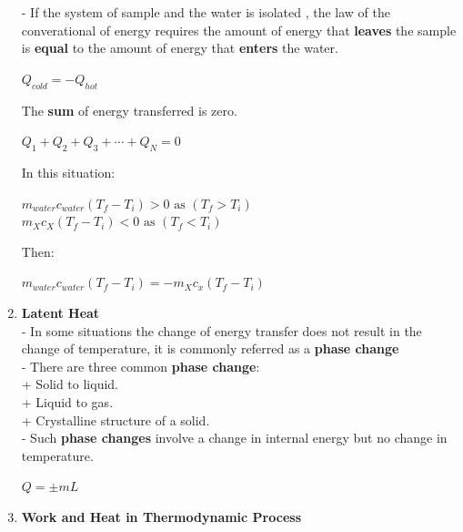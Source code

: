 \documentclass[10pt]{article}
\begin{document}
\begin{enumerate}
	- If the system of sample and the water is isolated , the law of the converational of energy requires the amount of energy that \textbf{leaves} the sample is \textbf{equal} to the amount of energy that \textbf{enters} the water.\\
	\begin{mybox}
	\begin{center}
	$Q_{cold} = -Q_{hot}$
	\end{center}
	\end{mybox}
      The \textbf{sum} of energy transferred is zero.
      \begin{mybox}
      \begin{center}
      $Q_1 + Q_2 + Q_3 + \cdots +Q_N = 0$
      \end{center}    
      \end{mybox}    
	In this situation:
	\begin{center}
	$m_{water}c_{water}(T_f-T_i) > 0 \mbox{ as }(T_f > T_i)$\\
	$m_Xc_X(T_f-T_i) <0 \mbox{ as } (T_f < T_i)$\\
	\end{center}
	Then:
	\begin{mybox}
	\begin{center}
	 $m_{water}c_{water}(T_f-T_i) = -m_Xc_x(T_f-T_i)$
	 \end{center}
	 \end{mybox}
	 \item \textbf{Latent Heat}\\
	 - In some situations the change of energy transfer does not result in the change of temperature, it is commonly referred as a \textbf{phase change}\\
	 - There are three common \textbf{phase change}:\\
	  + Solid to liquid.\\
	  + Liquid to gas.\\
	  + Crystalline structure of a solid.\\
	 - Such \textbf{phase changes} involve a change in internal energy but no change in temperature.\\
	\begin{mybox}
	\begin{center}
	$Q = \pm mL$
	\end{center}
	\end{mybox}
	\item \textbf{Work and Heat in Thermodynamic Process}
	\begin{mybox}
	\begin{center}

\end{center}
\end{mybox}
\end{enumerate}
\end{document}
